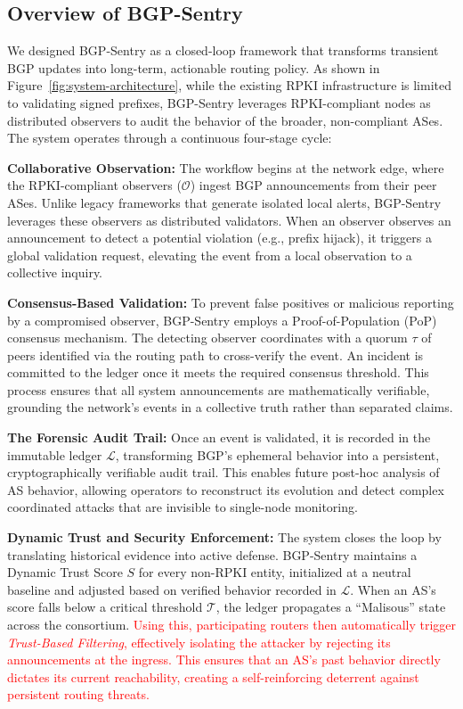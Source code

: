 \subsection{Overview of BGP-Sentry}
\label{subsec:defense_concept}

We designed BGP-Sentry as a closed-loop framework that transforms transient BGP updates into long-term, actionable routing policy. As shown in Figure~\ref{fig:system-architecture}, while the existing RPKI infrastructure is limited to validating signed prefixes, BGP-Sentry leverages RPKI-compliant nodes as distributed observers to audit the behavior of the broader, non-compliant ASes. The system operates through a continuous four-stage cycle: 

 \textbf{Collaborative Observation:} The workflow begins at the network edge, where the RPKI-compliant observers ($\mathcal{O}$) ingest BGP announcements from their peer ASes. Unlike legacy frameworks that generate isolated local alerts, BGP-Sentry leverages these observers as distributed validators. When an observer observes an announcement to detect a potential violation (e.g., prefix hijack), it triggers a global validation request, elevating the event from a local observation to a collective inquiry.

 \textbf{Consensus-Based Validation:} To prevent false positives or malicious reporting by a compromised observer, BGP-Sentry employs a Proof-of-Population (PoP) consensus mechanism. The detecting observer coordinates with a quorum $\tau$ of peers identified via the routing path to cross-verify the event. An incident is committed to the ledger once it meets the required consensus threshold. This process ensures that all system announcements are mathematically verifiable, grounding the network's events in a collective truth rather than separated claims.

 \textbf{The Forensic Audit Trail:} Once an event is validated, it is recorded in the immutable ledger $\mathcal{L}$, transforming BGP's ephemeral behavior into a persistent, cryptographically verifiable audit trail. This enables future post-hoc analysis of AS behavior, allowing operators to reconstruct its evolution and detect complex coordinated attacks that are invisible to single-node monitoring.

 \textbf{Dynamic Trust and Security Enforcement:} The system closes the loop by translating historical evidence into active defense. BGP-Sentry maintains a Dynamic Trust Score $S$ for every non-RPKI entity, initialized at a neutral baseline and adjusted based on verified behavior recorded in $\mathcal{L}$. When an AS's score falls below a critical threshold $\mathcal{T}$, the ledger propagates a ``Malisous'' state across the consortium. \textcolor{red}{Using this, participating routers then automatically trigger \textit{Trust-Based Filtering}, effectively isolating the attacker by rejecting its announcements at the ingress. This ensures that an AS's past behavior directly dictates its current reachability, creating a self-reinforcing deterrent against persistent routing threats.}



